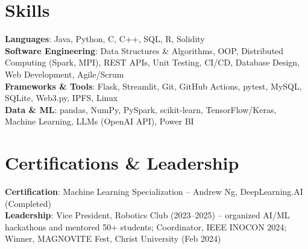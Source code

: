\documentclass[letterpaper,11pt]{article}
\begin{document}
\section{Skills}
 \begin{itemize}[leftmargin=0.15in, label={}]
    \small{\item{
     \textbf{Languages}{: Java, Python, C, C++, SQL, R, Solidity} \\
     \textbf{Software Engineering}{: Data Structures \& Algorithms, OOP, Distributed Computing (Spark, MPI), REST APIs, Unit Testing, CI/CD, Database Design, Web Development, Agile/Scrum} \\
     \textbf{Frameworks \& Tools}{: Flask, Streamlit, Git, GitHub Actions, pytest, MySQL, SQLite, Web3.py, IPFS, Linux} \\
     \textbf{Data \& ML}{: pandas, NumPy, PySpark, scikit-learn, TensorFlow/Keras, Machine Learning, LLMs (OpenAI API), Power BI}
    }}
 \end{itemize}

\section{Certifications \& Leadership}
 \begin{itemize}[leftmargin=0.15in, label={}]
    \small{\item{
     \textbf{Certification}{: Machine Learning Specialization -- Andrew Ng, DeepLearning.AI (Completed)} \\
     \textbf{Leadership}{: Vice President, Robotics Club (2023--2025) -- organized AI/ML hackathons and mentored 50+ students; Coordinator, IEEE INOCON 2024; Winner, MAGNOVITE Fest, Christ University (Feb 2024)}
    }}
 \end{itemize}
\end{document}
